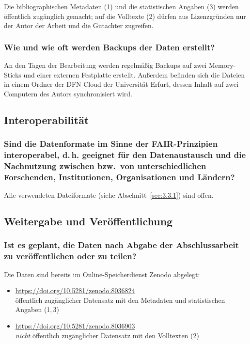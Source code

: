 \documentclass[%
  11pt,
  DIV=16,
  a4paper,
  BCOR=15mm,
  twoside=on,
  bibliography=totoc,
  headings=normal,
  numbers=noendperiod,
]{scrartcl}
\begin{document}
Die bibliographischen Metadaten (1) und die statistischen Angaben (3) werden öffentlich zugänglich gemacht;
auf die Volltexte (2) dürfen aus Lizenzgründen nur der Autor der Arbeit und die Gutachter zugreifen.

\subsubsection{Wie und wie oft werden Backups der Daten erstellt?}

An den Tagen der Bearbeitung werden regelmäßig Backups auf zwei Memory-Sticks und einer externen Festplatte erstellt.
Außerdem befinden sich die Dateien in einem Ordner der DFN-Cloud der Universität Erfurt,
dessen Inhalt auf zwei Computern des Autors synchronisiert wird.

\subsection{Interoperabilität}

\subsubsection{Sind die Datenformate im Sinne der FAIR-Prinzipien interoperabel, \texorpdfstring{d.\,h.}{d.h.} geeignet für den Datenaustausch und die Nachnutzung zwischen bzw.\ von unterschiedlichen Forschenden, Institutionen, Organisationen und Ländern?}

Alle verwendeten Dateiformate (siehe Abschnitt~\ref{sec:3.3.1}) sind offen.

\subsection{Weitergabe und Veröffentlichung}

\subsubsection{Ist es geplant, die Daten nach Abgabe der Abschlussarbeit zu veröffentlichen oder zu teilen?}
\label{sec:4.4.1}

Die Daten sind bereits im Online-Speicherdienst Zenodo abgelegt:
%
\begin{itemize}
  \item
    \url{https://doi.org/10.5281/zenodo.8036824} \\
    öffentlich zugänglicher Datensatz mit den Metadaten und statistischen Angaben (1,\,3)
  \item
    \url{https://doi.org/10.5281/zenodo.8036903} \\
    \emph{nicht} öffentlich zugänglicher Datensatz mit den Volltexten (2)
\end{itemize}
%
\end{document}
